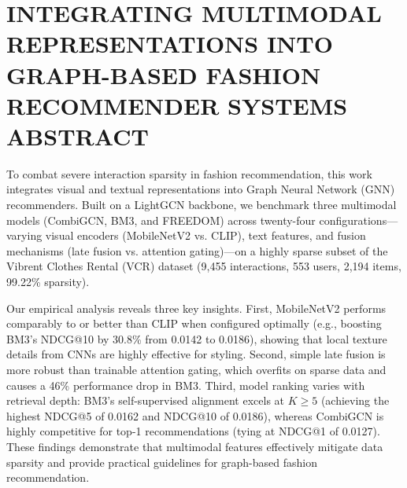 \chapter*{INTEGRATING MULTIMODAL REPRESENTATIONS INTO GRAPH-BASED FASHION RECOMMENDER SYSTEMS\\ABSTRACT}

To combat severe interaction sparsity in fashion recommendation, this work integrates visual and textual representations into Graph Neural Network (GNN) recommenders. Built on a LightGCN backbone, we benchmark three multimodal models (CombiGCN, BM3, and FREEDOM) across twenty-four configurations---varying visual encoders (MobileNetV2 vs. CLIP), text features, and fusion mechanisms (late fusion vs. attention gating)---on a highly sparse subset of the Vibrent Clothes Rental (VCR) dataset (9,455 interactions, 553 users, 2,194 items, 99.22\% sparsity).

Our empirical analysis reveals three key insights. First, MobileNetV2 performs comparably to or better than CLIP when configured optimally (e.g., boosting BM3's NDCG@10 by 30.8\% from 0.0142 to 0.0186), showing that local texture details from CNNs are highly effective for styling. Second, simple late fusion is more robust than trainable attention gating, which overfits on sparse data and causes a 46\% performance drop in BM3. Third, model ranking varies with retrieval depth: BM3's self-supervised alignment excels at $K \ge 5$ (achieving the highest NDCG@5 of 0.0162 and NDCG@10 of 0.0186), whereas CombiGCN is highly competitive for top-1 recommendations (tying at NDCG@1 of 0.0127). These findings demonstrate that multimodal features effectively mitigate data sparsity and provide practical guidelines for graph-based fashion recommendation.
